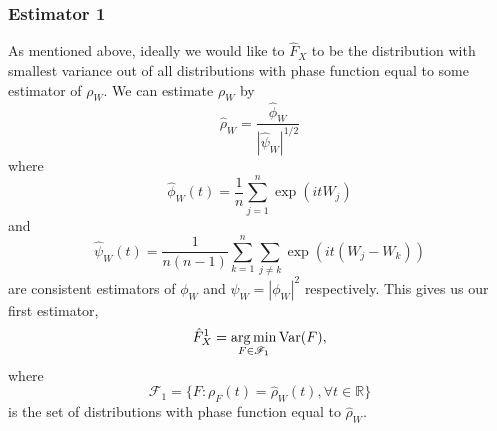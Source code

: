 	\subsubsection{Estimator 1}
	As mentioned above, ideally we would like to $\hat{F}_X$ to be the distribution with smallest variance out of all distributions with phase function equal to some estimator of $\rho_W$. We can estimate $\rho_W$ by
	\begin{equation}
		\hat{\rho}_W = \frac{\hat{\phi}_W}{\left|\hat{\psi}_W\right|^{1/2}}
	\end{equation}
	where
	\begin{equation}
	\label{eq:define hat phi W}
		\hat{\phi}_W(t) = \frac{1}{n}\sum_{j = 1}^n \exp(it W_j)
	\end{equation}
	and 
	\begin{equation}
	\label{eq:define hat psi W}
		\hat{\psi}_W(t) = \frac{1}{n(n-1)} \sum_{k=1}^n \sum_{j \neq k} \exp(it (W_j - W_k))
	\end{equation}
	are consistent estimators of $\phi_W$ and $\psi_W = |\phi_W|^2$ respectively. This gives us our first estimator,
	\begin{equation}
		\hat{F}_X^1 = \operatorname*{arg\,min}_{F \in \mathscr{F}_1} \mathrm{Var}(F),
	\end{equation}
	where 
	\begin{equation}
		\mathscr{F}_1 = \{F: \rho_F(t) = \hat{\rho}_W(t), \forall t \in \mathbb{R}\}
	\end{equation}
	is the set of distributions with phase function equal to $\hat{\rho}_W$.

